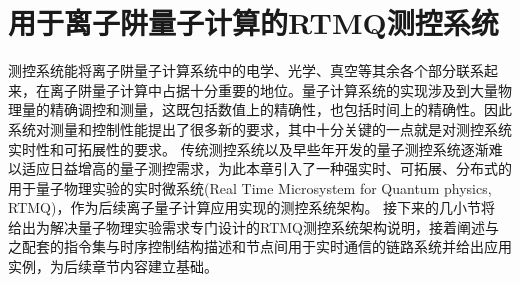 
\chapter[用于离子阱量子计算的RTMQ测控系统]{用于离子阱量子计算的RTMQ测控系统\label{section:fpga_rtmq}}


测控系统能将离子阱量子计算系统中的电学、光学、真空等其余各个部分联系起来，在离子阱量子计算中占据十分重要的地位。量子计算系统的实现涉及到大量物理量的精确调控和测量，这既包括数值上的精确性，也包括时间上的精确性。因此系统对测量和控制性能提出了很多新的要求，其中十分关键的一点就是对测控系统实时性和可拓展性的要求。
传统测控系统以及早些年开发的量子测控系统逐渐难以适应日益增高的量子测控需求，为此本章引入了一种强实时、可拓展、分布式的用于量子物理实验的实时微系统(Real Time Microsystem for Quantum physics, RTMQ)，作为后续离子量子计算应用实现的测控系统架构。
接下来的几小节将
给出为解决量子物理实验需求专门设计的RTMQ测控系统架构说明，接着阐述与之配套的指令集与时序控制结构描述和节点间用于实时通信的链路系统并给出应用实例，为后续章节内容建立基础。




